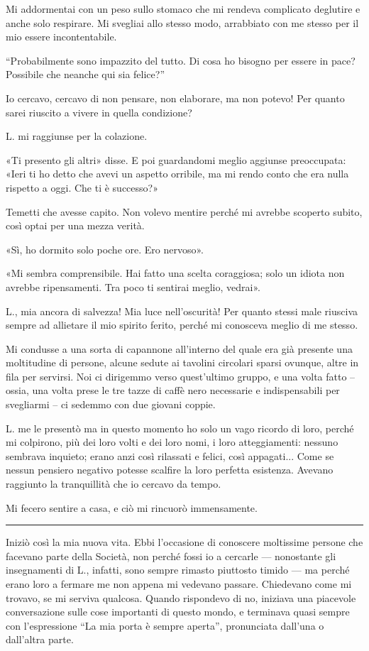 \documentclass[a4paper,11pt,oneside,openright,final]{memoir}
\begin{document}
Mi addormentai con un peso sullo stomaco che mi rendeva complicato deglutire e
anche solo respirare. Mi svegliai allo stesso modo, arrabbiato con me stesso
per il mio essere incontentabile.

``Probabilmente sono impazzito del tutto. Di cosa ho bisogno per essere in pace?
Possibile che neanche qui sia felice?''

Io cercavo, cercavo di non pensare, non elaborare, ma non potevo! Per quanto
sarei riuscito a vivere in quella condizione?

L. mi raggiunse per la colazione.

«Ti presento gli altri» disse. E poi guardandomi meglio aggiunse preoccupata:
«Ieri ti ho detto che avevi un aspetto orribile, ma mi rendo conto che era nulla
rispetto a oggi. Che ti è successo?»

Temetti che avesse capito. Non volevo mentire perché mi avrebbe scoperto subito,
così optai per una mezza verità.

«Sì, ho dormito solo poche ore. Ero nervoso».

«Mi sembra comprensibile. Hai fatto una scelta coraggiosa; solo un idiota non
avrebbe ripensamenti. Tra poco ti sentirai meglio, vedrai».

L., mia ancora di salvezza! Mia luce nell'oscurità! Per quanto stessi male
riusciva sempre ad allietare il mio spirito ferito, perché mi conosceva meglio
di me stesso.

Mi condusse a una sorta di capannone all'interno del quale era già presente una
moltitudine di persone, alcune sedute ai tavolini circolari sparsi ovunque,
altre in fila per servirsi. Noi ci dirigemmo verso quest'ultimo gruppo, e una
volta fatto -- ossia, una volta prese le tre tazze di caffè nero necessarie e
indispensabili per svegliarmi -- ci sedemmo con due giovani coppie.

L. me le presentò ma in questo momento ho solo un vago ricordo di loro, perché
mi colpirono, più dei loro volti e dei loro nomi, i loro atteggiamenti: nessuno
sembrava inquieto; erano anzi così rilassati e felici, così appagati... Come se
nessun pensiero negativo potesse scalfire la loro perfetta esistenza. Avevano
raggiunto la tranquillità che io cercavo da tempo.

Mi fecero sentire a casa, e ciò mi rincuorò immensamente.

\plainbreak{1}

Iniziò così la mia nuova vita. Ebbi l'occasione di conoscere moltissime persone
che facevano parte della Società, non perché fossi io a cercarle --- nonostante
gli insegnamenti di L., infatti, sono sempre rimasto piuttosto timido --- ma
perché erano loro a fermare me non appena mi vedevano passare. Chiedevano come
mi trovavo, se mi serviva qualcosa. Quando rispondevo di no, iniziava una
piacevole conversazione sulle cose importanti di questo mondo, e terminava
quasi sempre con l'espressione ``La mia porta è sempre aperta'', pronunciata
dall'una o dall'altra parte.
\end{document}
